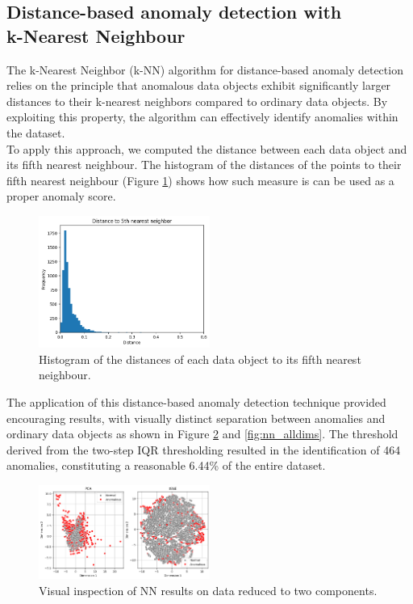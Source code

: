 \documentclass[9pt,twocolumn]{article}
\begin{document}
\subsection{Distance-based anomaly detection with\\k-Nearest Neighbour}
The k-Nearest Neighbor (k-NN) algorithm for distance-based anomaly detection relies on the principle that anomalous data objects exhibit significantly larger distances to their k-nearest neighbors compared to ordinary data objects. By exploiting this property, the algorithm can effectively identify anomalies within the dataset.\\
To apply this approach, we computed the distance between each data object and its fifth nearest neighbour. The histogram of the distances of the points to their fifth nearest neighbour (Figure \ref{fig:nn_disthist}) shows how such measure is can be used as a proper anomaly score.
\begin{figure}[h]
    \centering
    \includegraphics[width=0.5\textwidth]{images/NN_disthist.png}
    \caption{Histogram of the distances of each data object to its fifth nearest neighbour.}
    \label{fig:nn_disthist}
 \end{figure}
 
The application of this distance-based anomaly detection technique provided encouraging results, with visually distinct separation between anomalies and ordinary data objects as shown in Figure \ref{fig:nn_PCATSNE} and \ref{fig:nn_alldims}. The threshold derived from the two-step IQR thresholding resulted in the identification of 464 anomalies, constituting a reasonable 6.44\% of the entire dataset.

\begin{figure}[h]
    \centering
    \includegraphics[width=0.5\textwidth]{images/NN_PCATSNE.png}
    \caption{Visual inspection of NN results on data reduced to two components.}
    \label{fig:nn_PCATSNE}
 \end{figure}
\end{document}
